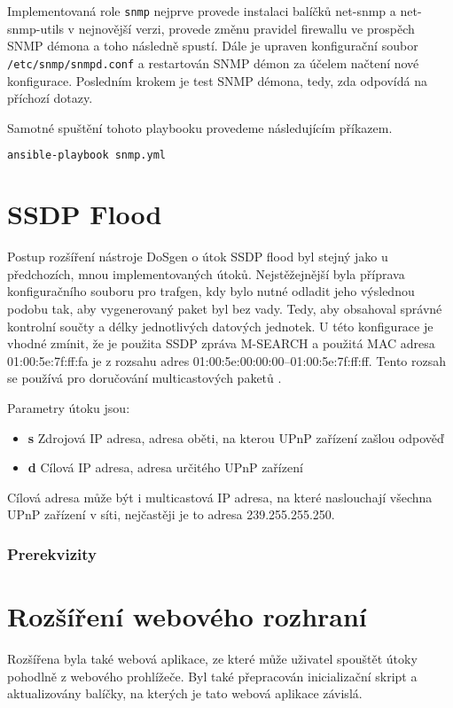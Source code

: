 Implementovaná role \texttt{snmp} nejprve provede instalaci balíčků net-snmp a net-snmp-utils v nejnovější verzi, provede změnu pravidel firewallu ve prospěch SNMP démona a toho následně spustí. Dále je upraven konfigurační soubor \texttt{/etc/snmp/snmpd.conf} a restartován SNMP démon za účelem načtení nové konfigurace. Posledním krokem je test SNMP démona, tedy, zda odpovídá na příchozí dotazy.

Samotné spuštění tohoto playbooku provedeme následujícím příkazem.

\begin{lstlisting}[language=bash]
ansible-playbook snmp.yml
\end{lstlisting}

\section{SSDP Flood}
Postup rozšíření nástroje DoSgen o útok SSDP flood byl stejný jako u předchozích, mnou implementovaných útoků. Nejstěžejnější byla příprava konfiguračního souboru pro trafgen, kdy bylo nutné odladit jeho výslednou podobu tak, aby vygenerovaný paket byl bez vady. Tedy, aby obsahoval správné kontrolní součty a délky jednotlivých datových jednotek. U této konfigurace je vhodné zmínit, že je použita SSDP zpráva M-SEARCH a použitá MAC adresa 01:00:5e:7f:ff:fa je z rozsahu adres 01:00:5e:00:00:00–01:00:5e:7f:ff:ff. Tento rozsah se používá pro doručování multicastových paketů \cite{Deering1989}. 

\noindent Parametry útoku jsou:
\begin{itemize}
	\item \textbf{s} Zdrojová IP adresa, adresa oběti, na kterou UPnP zařízení zašlou odpověď
	\item \textbf{d} Cílová IP adresa, adresa určitého UPnP zařízení
\end{itemize}

Cílová adresa může být i multicastová IP adresa, na které naslouchají všechna UPnP zařízení v síti, nejčastěji je to adresa 239.255.255.250.

\subsubsection{Prerekvizity}

\section{Rozšíření webového rozhraní}
Rozšířena byla také webová aplikace, ze které může uživatel spouštět útoky pohodlně z webového prohlížeče. Byl také přepracován inicializační skript a aktualizovány balíčky, na kterých je tato webová aplikace závislá.

